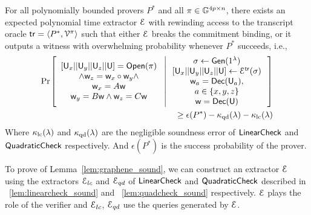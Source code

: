 %
\begin{lemma}[Soundness]\label{lem:graphene_sound}
	For all polynomially bounded provers $P^\ast$ and all $\pi\in\mathbb{G}^{4p\times n}$, there exists an expected polynomial time extractor $\mathcal{E}$ with rewinding access to the transcript oracle $\mathsf{tr} = \langle P^{\ast},\mathcal{V}^{\pi}\rangle$ such that either $\mathcal{E}$ breaks the commitment binding, or it outputs a witness with overwhelming probability whenever $P^\ast$ succeeds, i.e.,
	{\footnotesize
		\begin{align*}
		\condprob{
			\begin{array}{c}
			{[}\ewit_x||\ewit_y||\ewit_z||\ewit{]}=\open(\pi)\\\wedge
			\wit_z=\wit_x\circ\wit_y\wedge\\ \wit_x=A\wit\\
			\wit_y=B\wit \wedge \wit_z=C\wit
			\end{array}
		}{
			\begin{array}{c}
			\sigma %
			\leftarrow \gen(\secparam) \\
			{[}\ewit_x||\ewit_y||\ewit_z||\ewit{]}%
			\leftarrow \extr^{\mathsf{tr}}(\sigma) \\ 
			\wit_a=\dec(\ewit_a),\\ a\in \{x,y,z\}\\
			\wit=\dec(\ewit)
			\end{array}
		}\\
		\geq \epsilon(P^\ast) - \kappa_{\rm qd}(\secpar) -\kappa_{\rm lc}(\secpar)
		\end{align*}
	}
	Where $\kappa_{\rm lc}(\lambda)$ and $\kappa_{\rm qd}(\lambda)$ are the negligible soundness error of $\mathsf{LinearCheck}$ and $\mathsf{QuadraticCheck}$ respectively. And $\epsilon(P^\ast)$ is the success probability of the prover.
\end{lemma}


To prove of Lemma~\ref{lem:graphene_sound}, we can construct an extractor $\mathcal{E}$ using the extractors $\mathcal{E}_{lc}$ and $\mathcal{E}_{qd}$ of $\mathsf{LinearCheck}$ and $\mathsf{QuadraticCheck}$ described in ~\ref{lem:linearcheck_sound} and ~\ref{lem:quadcheck_sound} respectively. $\mathcal{E}$ plays the role of the verifier and $\mathcal{E}_{lc}$, $\mathcal{E}_{qd}$ use the queries generated by $\mathcal{E}$.

